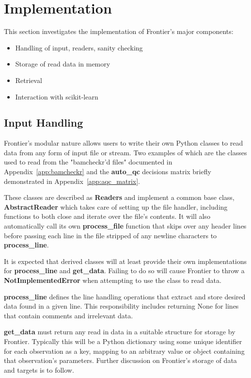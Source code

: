 \section{Implementation}

This section investigates the implementation of Frontier's major components:

\begin{itemize}
    \item Handling of input, readers, sanity checking
    \item Storage of read data in memory
    \item Retrieval
    \item Interaction with scikit-learn
\end{itemize}


\subsection{Input Handling}

Frontier's modular nature allows users to write their own Python classes to read
data from any form of input file or stream. Two examples of which are the
classes used to read from the "bamcheckr'd files" documented in
Appendix~\ref{app:bamcheckr} and the \textbf{auto\_qc} decisions matrix briefly
demonstrated in Appendix~\ref{app:aqc_matrix}.

These classes are described as \textbf{Readers} and implement a common base
class, \textbf{AbstractReader} which takes care of
setting up the file handler, including functions to both close and iterate over
the file's contents. It will also automatically call its own
\textbf{process\_file} function that skips over any header lines before passing
each line in the file stripped of any newline characters to \textbf{process\_line}.

It is expected that derived classes will at least provide their own
implementations for \textbf{process\_line} and \textbf{get\_data}. Failing to do
so will cause Frontier to throw a \textbf{NotImplementedError} when attempting
to use the class to read data.

\textbf{process\_line} defines the line handling operations that extract and store
desired data found in a given line. This responsibility includes returning None
for lines that contain comments and irrelevant data.

\textbf{get\_data} must return any read in data in a suitable structure for
storage by Frontier. Typically this will be a Python dictionary using some
unique identifier for each observation as a key, mapping to an arbitrary value
or object containing that observation's parameters. Further discussion on
Frontier's storage of data and targets is to follow.

